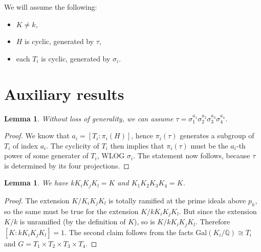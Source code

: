 \documentclass[12pt,a4paper]{article}
\newtheorem{lemma}[theorem]{Lemma}
\newcommand{\Q}{\mathbb{Q}}
\newcommand{\Gal}{\mathrm{Gal}}
\begin{document}
We will assume the following:
\begin{itemize}
\item $K\neq k$,
\item $H$ is cyclic, generated by $\tau$,
\item each $T_i$ is cyclic, generated by $\sigma_i$.
\end{itemize}

\section{Auxiliary results}
\begin{lemma}
Without loss of generality, we can assume $\tau=\sigma_1^{a_1}\sigma_2^{a_2}\sigma_3^{a_3}\sigma_4^{a_4}$.
\end{lemma}
\begin{proof}
We know that $a_i=[T_i:\pi_i(H)]$, hence
$\pi_i(\tau)$ generates a subgroup of $T_i$ of index $a_i$. The cyclicity of $T_i$ then implies that $\pi_i(\tau)$ must be the $a_i$-th power of some generater of $T_i$, WLOG $\sigma_i$. The statement now follows, because $\tau$ is determined by its four projections.
\end{proof}

\begin{lemma}\label{comp}
We have $kK_iK_jK_l=K$ and $K_1K_2K_3K_4=K$.
\end{lemma}
\begin{proof}
The extension $K/K_iK_jK_l$ is totally ramified at the prime ideals above $p_h$, so the same must be true for the extension $K/kK_iK_jK_l$. But since the extension $K/k$ is unramified (by the definition of $K$), so is $K/kK_iK_jK_l$. Therefore $[K:kK_iK_jK_l]=1$. The second claim follows from the facts $\Gal(K_i/\Q)\cong T_i$ and $G=T_1\times T_2\times T_3\times T_4$.
\end{proof}
\begin{center}
\end{center}
\end{document}
